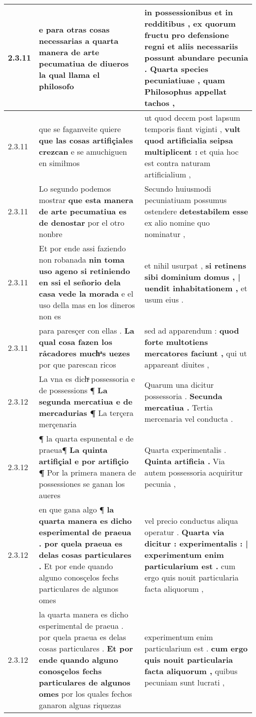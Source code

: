 \begin{tabular}{|p{1cm}|p{6.5cm}|p{6.5cm}|}
2.3.11 & e para otras cosas necessarias \textbf{ a quarta manera de arte pecumatiua de diueros } la qual llama el philosofo & in possessionibus et in redditibus , ex quorum fructu pro defensione regni et aliis necessariis possunt abundare pecunia . \textbf{ Quarta species pecuniatiuae , } quam Philosophus appellat tachos , \\\hline
2.3.11 & que se faganveite quiere \textbf{ que las cosas artifiçiales crezcan } e se amuchiguen en simiłmos & ut quod decem post lapsum temporis fiant viginti , \textbf{ vult quod artificialia seipsa multiplicent : } et quia hoc est contra naturam artificialium , \\\hline
2.3.11 & Lo segundo podemos mostrar \textbf{ que esta manera de arte pecumatiua es de denostar } por el otro nonbre & Secundo huiusmodi pecuniatiuam possumus ostendere \textbf{ detestabilem esse } ex alio nomine quo nominatur , \\\hline
2.3.11 & Et por ende assi faziendo non robanada \textbf{ nin toma uso ageno si retiniendo en ssi el señorio dela casa vede la morada } e el uso della mas en los dineros non es & et nihil usurpat , \textbf{ si retinens sibi dominium domus , | uendit inhabitationem , } et usum eius . \\\hline
2.3.11 & para paresçer con ellas . \textbf{ La qual cosa fazen los rảcadores muchͣs uezes } por que parescan ricos & sed ad apparendum : \textbf{ quod forte multotiens mercatores faciunt , } qui ut appareant diuites , \\\hline
2.3.12 & La vna es dichͣ possessoria e de possessions ¶ \textbf{ La segunda mercatiua e de mercadurias ¶ } La terçera merçenaria & Quarum una dicitur possessoria . \textbf{ Secunda mercatiua . } Tertia mercenaria vel conducta . \\\hline
2.3.12 & ¶ la quarta espunental e de praeua¶ \textbf{ La quinta artifiçial e por artifiçio ¶ } Por la primera manera de possessiones se ganan los aueres & Quarta experimentalis . \textbf{ Quinta artificia . } Via autem possessoria acquiritur pecunia , \\\hline
2.3.12 & en que gana algo ¶ \textbf{ la quarta manera es dicho esperimental de praeua . por quela praeua es delas cosas particulares . } Et por ende quando alguno conosçelos fechs particulares de algunos omes & vel precio conductus aliqua operatur . \textbf{ Quarta via dicitur : experimentalis : | experimentum enim particularium est . } cum ergo quis nouit particularia facta aliquorum , \\\hline
2.3.12 & la quarta manera es dicho esperimental de praeua . por quela praeua es delas cosas particulares . \textbf{ Et por ende quando alguno conosçelos fechs particulares de algunos omes } por los quales fechos ganaron alguas riquezas & experimentum enim particularium est . \textbf{ cum ergo quis nouit particularia facta aliquorum , } quibus pecuniam sunt lucrati , \\\hline

\end{tabular}
